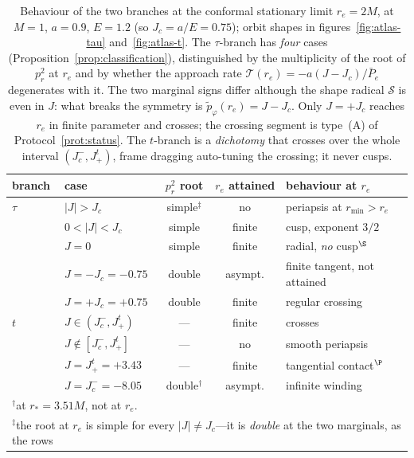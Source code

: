 \documentclass[12pt]{iopart}
\theoremstyle{plain}
\theoremstyle{definition}
\theoremstyle{remark}
\newcommand{\re}{r_{e}}
\begin{document}
\begin{table}[ht]
    \centering
    \small
    \caption{Behaviour of the two branches at the conformal stationary limit
    $\re=2M$, at $M=1$, $a=0.9$, $E=1.2$ (so $J_c=a/E=0.75$); orbit shapes in
    figures~\ref{fig:atlas-tau} and~\ref{fig:atlas-t}. The $\tau$-branch has
    \emph{four} cases (Proposition~\ref{prop:classification}), distinguished by
    the multiplicity of the root of $p_r^2$ at $\re$ and by whether the approach
    rate $\mathcal T(\re)=-a(J-J_c)/\bar P_e$ degenerates with it. The two
    marginal signs differ although the shape radical $\mathcal S$ is even in $J$:
    what breaks the symmetry is $\tilde p_\varphi(\re)=J-J_c$. Only $J=+J_c$
    reaches $\re$ in finite parameter and crosses; the crossing segment is
    type~(A) of Protocol~\ref{prot:status}. The $t$-branch is a \emph{dichotomy}
    that crosses over the whole interval $(J_c^-,J_+^t)$, frame dragging
    auto-tuning the crossing; it never cusps.}
    \label{tab:penetration}
    \footnotesize
    \begin{tabular}{llccl}
    \hline
    branch & case & $p_r^2$ root & $\re$ attained & behaviour at $\re$ \\
    \hline
    $\tau$ & $|J|>J_c$        & simple$^{\ddagger}$ & no      & periapsis at $r_{\min}>\re$ \\
           & $0<|J|<J_c$      & simple & finite  & cusp, exponent $3/2$ \\
           & $J=0$            & simple & finite  & radial, \emph{no} cusp$^{\S}$ \\
           & $J=-J_c=-0.75$   & double & asympt. & finite tangent, not attained \\
           & $J=+J_c=+0.75$   & double & finite  & regular crossing \\
    \hline
    $t$    & $J\in(J_c^-,J_+^t)$    & ---    & finite  & crosses \\
           & $J\notin[J_c^-,J_+^t]$ & ---    & no      & smooth periapsis \\
           & $J=J_+^t=+3.43$        & ---    & finite  & tangential contact$^{\P}$ \\
           & $J=J_c^-=-8.05$        & double$^{\dagger}$ & asympt. & infinite winding \\
    \hline
    \multicolumn{5}{l}{\footnotesize $^{\dagger}$at $r_*=3.51M$, not at $\re$.}\\
    \multicolumn{5}{l}{\footnotesize $^{\ddagger}$the root at $\re$ is simple for
    every $|J|\neq J_c$---it is \emph{double} at the two marginals, as the rows}\\

\end{tabular}
\end{table}
\end{document}
